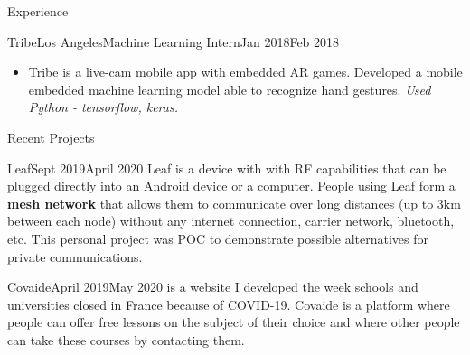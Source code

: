 \documentclass{resume}
\begin{document}
\begin{rSection}{Experience}
		\begin{job}{Tribe}{Los Angeles}{Machine Learning Intern}{Jan 2018}{Feb 2018}{
            \begin{itemize}
                \item Tribe is a live-cam mobile app with embedded AR games. Developed a mobile embedded machine learning model able to recognize hand gestures. \em{Used Python - tensorflow, keras.}
            \end{itemize}
		}
		\end{job}
	\end{rSection}

    \begin{rSection}{Recent Projects}
        \begin{project}{Leaf}{Sept 2019}{April 2020}{
            Leaf is a device with with RF capabilities that can be plugged directly into an Android device or a computer. People using Leaf form a \textbf{mesh network} that allows them to communicate over long distances (up to 3km between each node) without any internet connection, carrier network, bluetooth, etc. This personal project was POC to demonstrate possible alternatives for private  communications.
        }
        \end{project}

        \begin{project}{Covaide}{April 2019}{May 2020}{
             is a website I developed the week schools and universities closed in France because of COVID-19. Covaide is a platform where people can offer free lessons on the subject of their choice and where other people can take these courses by contacting them.
        }
        \end{project}
    \end{rSection}
\end{document}
